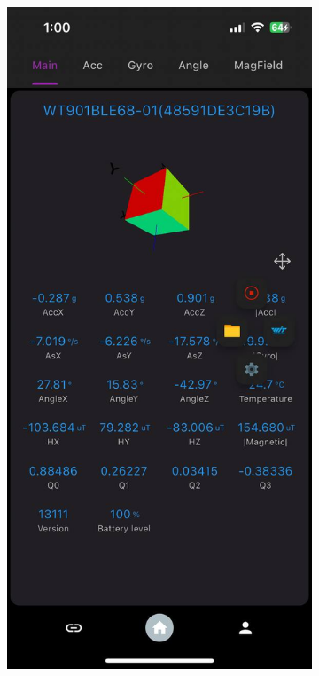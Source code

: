 \documentclass[12pt]{report}
\begin{document}
\begin{figure}[h]
\begin{subfigure}[b]{0.24\textwidth}
    \end{subfigure}
    \begin{subfigure}[b]{0.24\textwidth}
        \centering
        \includegraphics[width=\textwidth]{witmotion-app-interface-accelerometer-recording-screen}

\end{subfigure}
\end{figure}
\end{document}
